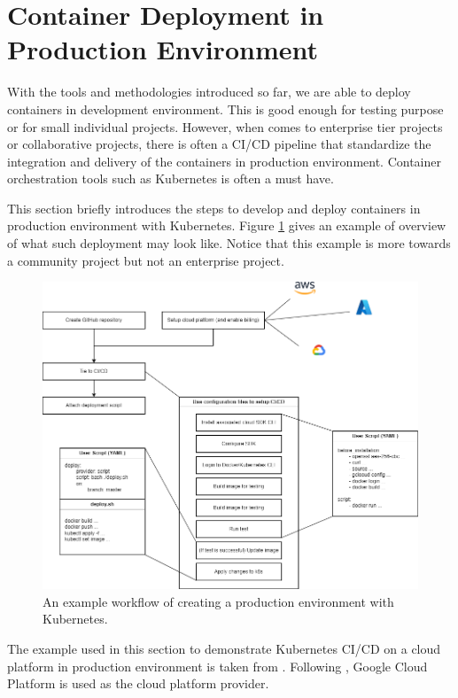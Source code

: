 \section{Container Deployment in Production Environment}

With the tools and methodologies introduced so far, we are able to deploy containers in development environment. This is good enough for testing purpose or for small individual projects. However, when comes to enterprise tier projects or collaborative projects, there is often a CI/CD pipeline that standardize the integration and delivery of the containers in production environment. Container orchestration tools such as Kubernetes is often a must have.

This section briefly introduces the steps to develop and deploy containers in production environment with Kubernetes. Figure \ref{ch:vac:fig:prodenvworkflow} gives an example of overview of what such deployment may look like. Notice that this example is more towards a community project but not an enterprise project.

\begin{figure}[htbp]
	\centering
	\includegraphics[width=350pt]{chapters/part-3/figures/prodenvworkflow.png}
	\caption{An example workflow of creating a production environment with Kubernetes.} \label{ch:vac:fig:prodenvworkflow}
\end{figure}

The example used in this section to demonstrate Kubernetes CI/CD on a cloud platform in production environment is taken from \cite{stephen2023docker}. Following \cite{stephen2023docker}, Google Cloud Platform is used as the cloud platform provider.

